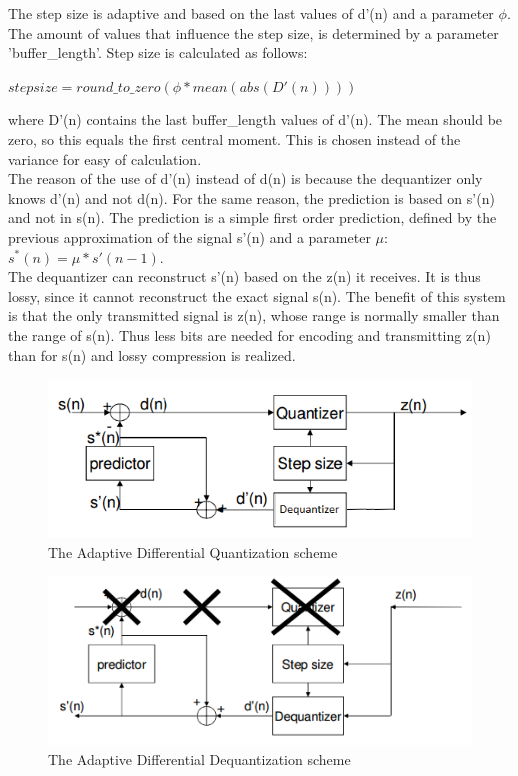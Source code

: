 \documentclass[a4paper]{article}
\begin{document}
The step size is adaptive and based on the last values of d'(n) and a parameter $\phi$. The amount of values that influence the step size, is determined by a parameter 'buffer\_length'. Step size is calculated as follows:\\
\begin{center}
$stepsize = round\_to\_zero(\phi*mean(abs(D'(n))))$\\
\end{center}
where D'(n) contains the last buffer\_length values of d'(n). The mean should be zero, so this equals the first central moment. This is chosen instead of the variance for easy of calculation. \\
The reason of the use of d'(n) instead of d(n) is because the dequantizer only knows d'(n) and not d(n). For the same reason, the prediction is based on s'(n) and not in s(n). The prediction is a simple first order prediction, defined by the previous approximation of the signal s'(n) and a parameter $\mu$:\\
$s^*(n) = \mu*s'(n-1)$.\\
The dequantizer can reconstruct s'(n) based on the z(n) it receives. It is thus lossy, since it cannot reconstruct the exact signal s(n). The benefit of this system is that the only transmitted signal is z(n), whose range is normally smaller than the range of s(n). Thus less bits are needed for encoding and transmitting z(n) than for s(n) and lossy compression is realized.
\begin{figure}[hbt]
\includegraphics[width = \textwidth]{Quantization.png}
\caption{The Adaptive Differential Quantization scheme}
\label{fig:quantization}
\end{figure}
\begin{figure}[hbt]
\includegraphics[width = \textwidth]{Dequantization.png}
\caption{The Adaptive Differential Dequantization scheme}
\label{fig:dequantization}
\end{figure}
\end{document}
